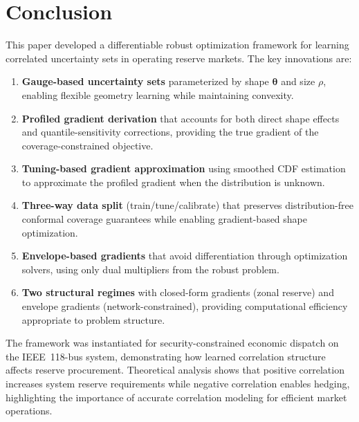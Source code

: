 \documentclass[lettersize,journal]{IEEEtran}
\newcommand{\btheta}{\bm{\theta}}
\theoremstyle{definition}
\begin{document}
\section{Conclusion}
\label{sec:conclusion}

This paper developed a differentiable robust optimization framework for learning correlated uncertainty sets in operating reserve markets. The key innovations are:

\begin{enumerate}
\item \textbf{Gauge-based uncertainty sets} parameterized by shape $\btheta$ and size $\rho$, enabling flexible geometry learning while maintaining convexity.

\item \textbf{Profiled gradient derivation} that accounts for both direct shape effects and quantile-sensitivity corrections, providing the true gradient of the coverage-constrained objective.

\item \textbf{Tuning-based gradient approximation} using smoothed CDF estimation to approximate the profiled gradient when the distribution is unknown.

\item \textbf{Three-way data split} (train/tune/calibrate) that preserves distribution-free conformal coverage guarantees while enabling gradient-based shape optimization.

\item \textbf{Envelope-based gradients} that avoid differentiation through optimization solvers, using only dual multipliers from the robust problem.

\item \textbf{Two structural regimes} with closed-form gradients (zonal reserve) and envelope gradients (network-constrained), providing computational efficiency appropriate to problem structure.
\end{enumerate}

The framework was instantiated for security-constrained economic dispatch on the IEEE~118-bus system, demonstrating how learned correlation structure affects reserve procurement. Theoretical analysis shows that positive correlation increases system reserve requirements while negative correlation enables hedging, highlighting the importance of accurate correlation modeling for efficient market operations.
\end{document}
